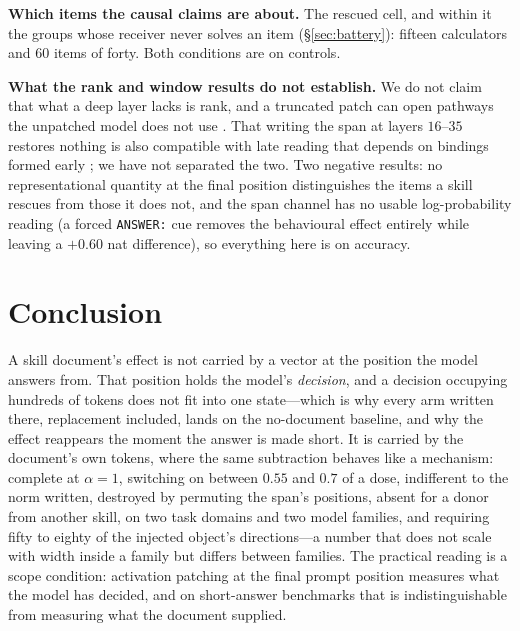 \documentclass{article}
\begin{document}
\textbf{Which items the causal claims are about.} The rescued cell, and within
it the groups whose receiver never solves an item (\S\ref{sec:battery}): fifteen
calculators and $60$ items of forty. Both conditions are on controls.

\textbf{What the rank and window results do not establish.} We do not claim
that what a deep layer lacks is rank, and a truncated patch can open pathways
the unpatched model does not use \citep{makelov2024illusion}. That writing the
span at layers $16$--$35$ restores nothing is also compatible with late reading
that depends on bindings formed early \citep{feng2024binding}; we have not
separated the two. Two negative results: no representational quantity at
the final position distinguishes the items a skill rescues from those it does
not, and the span channel has no usable log-probability reading (a forced
\texttt{ANSWER:} cue removes the behavioural effect entirely while leaving a
$+0.60$ nat difference), so everything here is on accuracy.

\section{Conclusion}

A skill document's effect is not carried by a vector at the position the model
answers from. That position holds the model's \emph{decision}, and a decision
occupying hundreds of tokens does not fit into one state---which is why every
arm written there, replacement included, lands on the no-document baseline, and
why the effect reappears the moment the answer is made short. It is carried by
the document's own tokens, where the same subtraction behaves like a mechanism:
complete at $\alpha=1$, switching on between $0.55$ and $0.7$ of a dose,
indifferent to the norm written, destroyed by permuting the span's positions,
absent for a donor from another skill, on two task domains and two model
families, and requiring fifty to eighty of the injected object's
directions---a number that does not scale with width inside a family but
differs between families. The practical reading is a scope condition:
activation patching at the final prompt position measures what the model has
decided, and on short-answer benchmarks that is indistinguishable from
measuring what the document supplied.

\label{endmain}
\clearpage



\clearpage
\appendix
\end{document}
